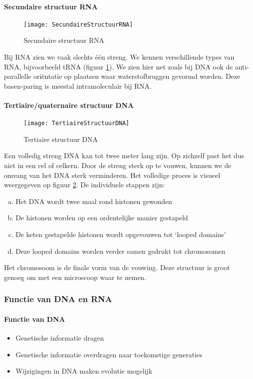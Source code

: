 \documentclass[a4paper,kul]{kulakarticle} %
\begin{document}
\paragraph{Secundaire structuur RNA}
\begin{figure}[h]
	\centering
	\texttt{[image: SecundaireStructuurRNA]}
	\caption[Secundaire structuur RNA]{Secundaire structuur RNA}
	\label{fig:secundairestructuurrna}
\end{figure}
Bij RNA zien we vaak slechts één streng. We kennen verschillende types van RNA, bijvoorbeeld tRNA (figuur \ref{fig:secundairestructuurrna}). We zien hier net zoals bij DNA ook de anti-parallelle oriëntatie op plaatsen waar waterstofbruggen gevormd worden. Deze basen-paring is meestal intramoleculair bij RNA. 
\newpage
\paragraph{Tertiaire/quaternaire structuur DNA}
\begin{figure}[h]
	\centering
	\texttt{[image: TertiaireStructuurDNA]}
	\caption[Tertiaire structuur DNA]{Tertiaire structuur DNA}
	\label{fig:tertiairestructuurdna}
\end{figure}
Een volledig streng DNA kan tot twee meter lang zijn. Op zichzelf past het dus niet in een cel of celkern. Door de streng sterk op te vouwen, kunnen we de omvang van het DNA sterk verminderen. Het volledige proces is visueel weergegeven op figuur \ref{fig:tertiairestructuurdna}. De individuele stappen zijn:
\begin{enumerate}[a)] 
	\item Het DNA wordt twee maal rond histonen gewonden 
	\item De histonen worden op een ordentelijke manier gestapeld
	\item De keten gestapelde histonen wordt opgevouwen tot `looped domains'
	\item Deze looped domains worden verder samen gedrukt tot chromosomen
\end{enumerate}
Het chromosoom is de finale vorm van de vouwing. Deze structuur is groot genoeg om met een microscoop waar te nemen. 
\newpage
\subsubsection{Functie van DNA en RNA}
\paragraph{Functie van DNA}
\begin{itemize}
	\item Genetische informatie dragen
	\item Genetische informatie overdragen naar toekomstige generaties
	\item Wijzigingen in DNA maken evolutie mogelijk
\end{itemize}
\end{document}
